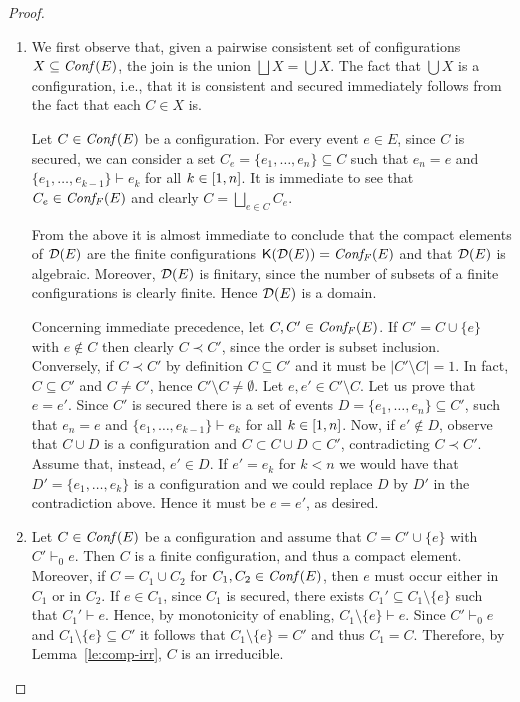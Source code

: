\begin{proof}
  \begin{enumerate}
  \item
    We first observe that, given a pairwise consistent set of
    configurations $X \subseteq \mathit{Conf}({E})$, the join is the union
    $\bigsqcup X = \bigcup X$. The fact that $\bigcup X$ is a
    configuration, i.e., that it is consistent and secured immediately
    follows from the fact that each $C \in X$ is.


    Let $C \in \mathit{Conf}({E})$ be a configuration.  For every event $e \in E$,
    since $C$ is secured, we can consider a set
    $C_e = \{ e_1, \ldots, e_n \} \subseteq C$ such that $e_n =e$ and
    $\{ e_1, \ldots, e_{k-1} \} \vdash e_k$ for all
    $k \in [{1},{n}]$. It is immediate to see that
    $C_e \in \mathit{Conf_F}({E})$ and clearly $C = \bigsqcup_{e \in C} C_e$.
    
    From the above it is almost immediate to conclude that the
    compact elements of $\mathcal{D}({{E}})$ are the finite configurations
    $\mathop{\mathsf{K}({\mathcal{D}({E})})} =\mathit{Conf_F}({E})$ and that $\mathcal{D}({{E}})$ is algebraic.
    Moreover, $\mathcal{D}({E})$ is finitary, since the number of subsets of a
    finite configurations is clearly finite. Hence $\mathcal{D}({{E}})$ is a
    domain.

    Concerning immediate precedence, let $C, C' \in \mathit{Conf_F}({E})$. If
    $C' = C \cup \{ e \}$ with $e \not\in C$ then clearly
    $C \prec C'$, since the order is subset inclusion. Conversely,
      if $C \prec C'$ by definition $C \subseteq C'$ and it must be
      $|C' \setminus C| = 1$. In fact, $C \subseteq C'$ and
      $C \neq C'$, hence $C' \setminus C \neq \emptyset$. Let
    $e, e' \in C' \setminus C$. Let us prove that $e=e'$. Since $C'$
    is secured there is a set of events
    $D = \{ e_1, \ldots, e_n \} \subseteq C'$, such that $e_n = e$ and
    $\{ e_1, \ldots, e_{k-1} \} \vdash e_k$ for all
    $k \in [{1},{n}]$. Now, if $e' \not\in D$, observe that
    $C \cup D$ is a configuration and $C \subset C \cup D \subset C'$,
    contradicting $C \prec C'$.
%
    Assume that, instead, $e' \in D$. If $e' = e_k$ for $k< n$ we would
    have that $D' = \{ e_1, \ldots, e_k \}$ is a configuration and we
    could replace $D$ by $D'$ in the contradiction above. Hence it
    must be $e =e'$, as desired.

    \medskip
  

  \item Let $C \in \mathit{Conf}({{E}})$ be a configuration and assume
    that $C = C' \cup \{ e \}$ with $C' \vdash_0 e$. Then $C$ is a finite configuration, and thus a compact element. Moreover, if
    $C = C_1 \cup C_2$ for $C_1, C_2 \in \mathit{Conf}({{E}})$, 
    then $e$ must occur either in $C_1$ or in
    $C_2$. If $e \in C_1$, since $C_1$ is secured,
    there exists $C_1' \subseteq C_1 \setminus \{ e \}$ such that
    $C_1' \vdash e$. Hence, by monotonicity of enabling,
    $C_1 \setminus \{ e \} \vdash e$. Since $C' \vdash_0 e$ and
    $C_1 \setminus \{ e \} \subseteq C'$ it follows that
    $C_1 \setminus \{ e \} = C'$ and thus $C_1 = C$.
    Therefore, by Lemma~\ref{le:comp-irr}, $C$ is an irreducible.
    

\end{enumerate}
\end{proof}
